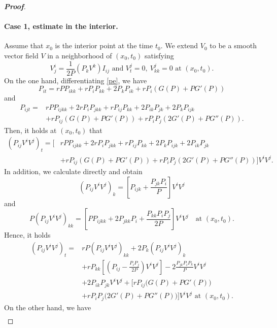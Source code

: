 \documentclass[10pt]{article}         %
\numberwithin{equation}{section}
\begin{document}
\begin{proof}[\bf Proof]
\paragraph{Case 1, estimate in the interior.} Assume that $x_0$ is the interior point at the time $t_0$.
We extend $V_0$ to be a smooth vector field $V$ in a neighborhood of $(x_0,t_0)$  satisfying
\begin{equation*}V^i_j=\frac{1}{2P}(P_kV^k)I_{ij}\text{ and }V^j_t=0,\ V^j_{kk}=0\text{ at } (x_0,t_0).\end{equation*}
On the one hand, differentiating \eqref{pe}, we have 
\[P_{it}=rPP_{ikk}+rP_iP_{kk}+2P_kP_{ik}+rP_i(G(P)+PG'(P))\]
and 
\begin{equation*}
\begin{aligned}P_{ijt}=&rPP_{ijkk}+2rP_iP_{jkk}+rP_{ij}P_{kk}+2P_{ik}P_{jk}+2P_{k}P_{ijk}\\
&+rP_{ij}(G(P)+PG'(P))+rP_iP_j(2G'(P)+PG''(P)).
\end{aligned}
\end{equation*}
Then, it holds at $(x_0,t_0)$ that 
\begin{equation}\label{kk1}
\begin{aligned}
(P_{ij}V^iV^j)_t=\big[&rPP_{ijkk}+2rP_iP_{jkk}+rP_{ij}P_{kk}+2P_{k}P_{ijk}+2P_{ik}P_{jk}\\
&+rP_{ij}(G(P)+PG'(P))+rP_iP_j(2G'(P)+PG''(P))\big]V^iV^j.  \end{aligned}
\end{equation}
In addition, we calculate directly and obtain 
\[(P_{ij}V^iV^j)_k=[P_{ijk}+\frac{P_{jk}P_i}{P}]V^iV^j\]
and 
\begin{equation*}\label{pijkk}
    P(P_{ij}V^iV^j)_{kk}=[PP_{ijkk}+2P_{jkk}P_i+\frac{P_{kk}P_iP_j}{2P}]V^iV^j\quad\text{at }(x_0,t_0).
\end{equation*}
 Hence, it holds 
\begin{equation*}
    \begin{aligned}
(P_{ij}V^iV^j)_t=& rP(P_{ij}V^iV^j)_{kk}+2P_k(P_{ij}V^iV^j)_k\\
&+rP_{kk}[(P_{ij}-\frac{P_iP_j}{2P})V^iV^j]-2\frac{P_{jk}P_iP_k}{P}V^iV^j\\
&+2P_{ik}P_{jk}V^iV^j+[rP_{ij}\big(G(P)+PG'(P)\big)\\
&+rP_iP_j\big(2G'(P)+PG''(P)\big)]V^iV^j\text{ at }(x_0,t_0). 
    \end{aligned}
\end{equation*}
 On the other hand, we have 
\begin{equation*}
\begin{aligned}

\end{aligned}
\end{equation*}
\end{proof}
\end{document}
